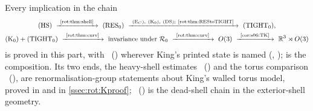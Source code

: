 \begin{remark}\label{rot:rem:chain}
Every implication in the chain
\begin{gather*}
\HS\ \xrightarrow{\ \text{\Cref{rot:thm:shell}}\ }\ \REz\ \xrightarrow{\ \EC,\ \Kz,\ \DSh;\ \text{\Cref{rot:thm:REStoTIGHT}}\ }\ \TIz ,\\
\Kz+\TIz\ \xrightarrow{\ \text{\Cref{rot:thm:curv}}\ }\ \text{invariance under }\Rgen\ \xrightarrow{\ \text{\Cref{rot:thm:curv}}\ }\ O(3)\ \xrightarrow{\ \text{\Cref{cor:s06:TK}}\ }\ \Euc
\end{gather*}
is proved in this part, with \EC\ () wherever King's printed state is named (, );  is the composition. Its two ends, the heavy-shell estimates \HS\ () and the torus comparison \Kz\ (), are renormalisation-group statements about King's walled torus model, proved in  and in \cref{ssec:rot:Kproof}; \DSh\ () is the dead-shell chain in the exterior-shell geometry.
\end{remark}
